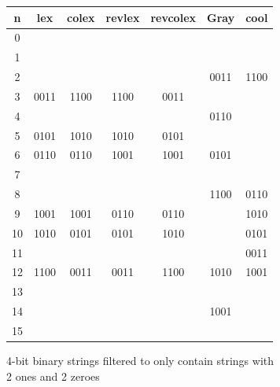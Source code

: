 \begin{figure}[]
     \begin{subfigure}[]{\textwidth}
         \begin{center}
             \begin{tabular}{ |c|c|c|c|c||c||c| } 
                 \hline
                 n &  lex  & colex & revlex & revcolex & Gray & cool\\
                 \hline
                 0 &      &      &      &      &       &      \\
                 1 &      &      &      &      &       &      \\
                 2 &      &      &      &      & 0011  & 1100 \\
                 3 & 0011 & 1100 & 1100 & 0011 &       &      \\
                 4 &      &      &      &      & 0110  &      \\
                 5 & 0101 & 1010 & 1010 & 0101 &       &      \\
                 6 & 0110 & 0110 & 1001 & 1001 & 0101  &      \\
                 7 &      &      &      &      &       &      \\
                 8 &      &      &      &      & 1100  & 0110 \\
                 9 & 1001 & 1001 & 0110 & 0110 &       & 1010 \\
                 10 & 1010 & 0101 & 0101 & 1010 &      & 0101 \\
                 11 &      &      &      &      &      & 0011 \\
                 12 & 1100 & 0011 & 0011 & 1100 & 1010 & 1001 \\
                 13 &      &      &      &      &      &      \\
                 14 &      &      &      &      & 1001 &      \\
                 15 &      &      &      &      &      &      \\
                 \hline
             \end{tabular}
         \end{center}
         \caption{4-bit binary strings filtered to only contain strings with 2 ones and 2 zeroes}
         \label{fig:bin4to2c2}
     \end{subfigure}
     \begin{subfigure}[]{\textwidth}
         \begin{center}
             \begin{tabular}{ |c|c|c|c||c||c| } 

\end{tabular}
\end{center}
\end{subfigure}
\end{figure}
